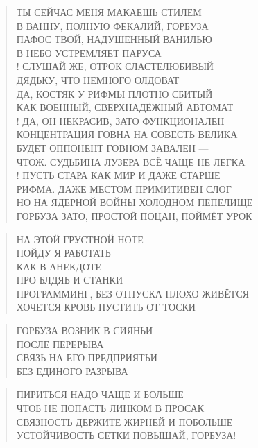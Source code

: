 \poemtitle{***}
\begin{verse}
ТЫ СЕЙЧАС МЕНЯ МАКАЕШЬ СТИЛЕМ\\
В ВАННУ, ПОЛНУЮ ФЕКАЛИЙ, ГОРБУЗА\\
ПАФОС ТВОЙ, НАДУШЕННЫЙ ВАНИЛЬЮ\\
В НЕБО УСТРЕМЛЯЕТ ПАРУСА\\!
СЛУШАЙ ЖЕ, ОТРОК СЛАСТЕЛЮБИВЫЙ\\
ДЯДЬКУ, ЧТО НЕМНОГО ОЛДОВАТ\\
ДА, КОСТЯК У РИФМЫ ПЛОТНО СБИТЫЙ\\
КАК ВОЕННЫЙ, СВЕРХНАДЁЖНЫЙ АВТОМАТ\\!
ДА, ОН НЕКРАСИВ, ЗАТО ФУНКЦИОНАЛЕН\\
КОНЦЕНТРАЦИЯ ГОВНА НА СОВЕСТЬ ВЕЛИКА\\
БУДЕТ ОППОНЕНТ ГОВНОМ ЗАВАЛЕН —\\
ЧТОЖ. СУДЬБИНА ЛУЗЕРА ВСЁ ЧАЩЕ НЕ ЛЕГКА\\!
ПУСТЬ СТАРА КАК МИР И ДАЖЕ СТАРШЕ\\
РИФМА. ДАЖЕ МЕСТОМ ПРИМИТИВЕН СЛОГ\\
НО НА ЯДЕРНОЙ ВОЙНЫ ХОЛОДНОМ ПЕПЕЛИЩЕ\\
ГОРБУЗА ЗАТО, ПРОСТОЙ ПОЦАН, ПОЙМЁТ УРОК
\end{verse}

\poemtitle{***}
\begin{verse}
НА ЭТОЙ ГРУСТНОЙ НОТЕ\\
ПОЙДУ Я РАБОТАТЬ\\
КАК В АНЕКДОТЕ\\
ПРО БЛДЯЬ И СТАНКИ\\
ПРОГРАММИНГ, БЕЗ ОТПУСКА ПЛОХО ЖИВЁТСЯ\\
ХОЧЕТСЯ КРОВЬ ПУСТИТЬ ОТ ТОСКИ
\end{verse}

\poemtitle{***}
\begin{verse}
ГОРБУЗА ВОЗНИК В СИЯНЬИ\\
ПОСЛЕ ПЕРЕРЫВА\\
СВЯЗЬ НА ЕГО ПРЕДПРИЯТЬИ\\
БЕЗ ЕДИНОГО РАЗРЫВА
\end{verse}

\poemtitle{***}
\begin{verse}
ПИРИТЬСЯ НАДО ЧАЩЕ И БОЛЬШЕ\\
ЧТОБ НЕ ПОПАСТЬ ЛИНКОМ В ПРОСАК\\
СВЯЗНОСТЬ ДЕРЖИТЕ ЖИРНЕЙ И ПОБОЛЬШЕ\\
УСТОЙЧИВОСТЬ СЕТКИ ПОВЫШАЙ, ГОРБУЗА!
\end{verse}

